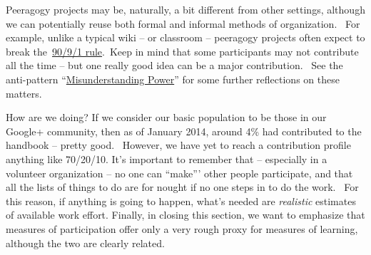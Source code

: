 Peeragogy projects may be, naturally, a bit different from other
settings, although we can potentially reuse both formal and informal
methods of organization.~ For example, unlike a typical wiki -- or
classroom -- peeragogy projects often expect to break
the~\href{http://en.wikipedia.org/wiki/1\%25_rule_\%28Internet_culture\%29}{90/9/1
rule}.~Keep in mind that some participants may not contribute all the
time -- but one really good idea can be a major contribution.~ See the
anti-pattern
``\href{http://peeragogy.org/practice/antipatterns/misunderstanding-power/}{Misunderstanding
Power}'' for some further reflections on these matters.

How are we doing? If we consider our basic population to be those in our
Google+ community, then as of January 2014, around 4\% had contributed to
the handbook -- pretty good.~ However, we have yet to reach a
contribution profile anything like 70/20/10.  It's important to remember that --
especially in a volunteer organization -- no one can ``make''' other
people participate, and that all the lists of things to do are for
nought if no one steps in to do the work.~ For this reason, if anything
is going to happen, what's needed are \emph{realistic} estimates of
available work effort. Finally, in closing this section, we want to
emphasize that measures of participation offer only a very rough proxy
for measures of learning, although the two are clearly related.

